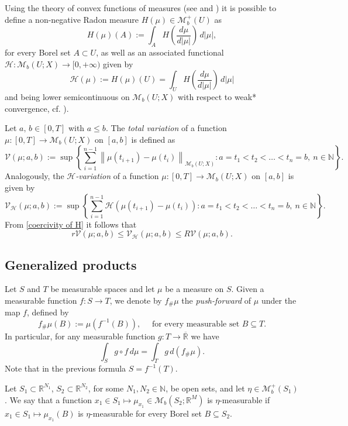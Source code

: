 \documentclass[reqno,10pt]{amsart}
\numberwithin{equation}{section}
\theoremstyle{remark}
\newcommand{\calH}{\mathcal{H}}
\newcommand{\N}{\mathbb{N}}
\newcommand{\R}{\mathbb{R}}
\newcommand{\U}{U}
\newcommand{\calV}{\mathcal{V}}
\newcommand{\closure}[1]{\overline{#1}}
\newcommand{\Mb}{\mathcal{M}_b}
\begin{document}
Using the theory of convex functions of measures (see \cite{Goffman.Serrin.1964} and \cite{Demengel.Temam.1984}) it is possible to define a non-negative Radon measure $H(\mu) \in \Mb^+(U)$ as
\[
	H(\mu)(A) := \int_{A} H\left(\frac{d\mu}{d|\mu|}\right) \,d|\mu|,
\]
for every Borel set $A \subset U$, as well as an associated
 functional $\calH: \Mb(U;X) \to [0,+\infty)$ given by
\[
	\calH(\mu) := H(\mu)(\U) = \int_{\U} H\left(\frac{d\mu}{d|\mu|}\right) \,d|\mu|
\]
and being lower semicontinuous on $\Mb(U;X)$ with respect to weak* convergence, cf. \cite[Theorem 2.38]{ambrosio2000functions}).

Let $a,\, b \in [0,T]$ with $a \leq b$.
The \emph{total variation} of a function $\mu : [0,T] \to \Mb(U;X)$ on $[a,b]$ is defined as
\begin{equation*}
	\calV(\mu; a, b) := \sup\left\{ \sum_{i = 1}^{n-1} \left\|\mu(t_{i+1}) - \mu(t_i)\right\|_{\Mb(U;X)} : a = t_1 < t_2 < \ldots < t_n = b,\ n \in \N \right\}.
\end{equation*}
Analogously, the \emph{$\calH$-variation} of a function $\mu : [0,T] \to \Mb(U;X)$ on $[a,b]$ is given by
\begin{equation*}
	\calV_{\calH}(\mu; a, b) := \sup\left\{ \sum_{i = 1}^{n-1} \calH\left(\mu(t_{i+1}) - \mu(t_i)\right) : a = t_1 < t_2 < \ldots < t_n = b,\ n \in \N \right\}.
\end{equation*}
From \eqref{coercivity of H} it follows that
\begin{equation} \label{equivalence of variations}
	r \calV(\mu; a, b) \leq \calV_{\calH}(\mu; a, b) \leq R \calV(\mu; a, b).
\end{equation}

\subsection{Generalized products}

Let $S$ and $T$ be measurable spaces and let $\mu$ be a measure on $S$.
Given a measurable function $f : S \to T$, we denote by $f_{\#}\mu$ the \emph{push-forward} of $\mu$ under the map $f$, defined by
\[
	f_{\#}\mu(B) := \mu\left(f^{-1}(B)\right), \quad \text{ for every measurable set $B \subseteq T$}.
\]
In particular, for any measurable function $g : T \to \closure{\R}$ we have
\[
	\int_{S} g \circ f \,d\mu = \int_{T} g \,d(f_{\#}\mu).
\]
Note that in the previous formula $S = f^{-1}(T)$.

Let $S_1 \subset \R^{N_1}$, $S_2 \subset \R^{N_2}$, for some $N_1,N_2 \in \N$, be open sets, and let $\eta \in \Mb^+(S_1)$.
We say that a function $x_1 \in S_1 \mapsto \mu_{x_1} \in \Mb(S_2; \R^M )$ is $\eta$-measurable if $x_1 \in S_1 \mapsto \mu_{x_1}(B)$ is $\eta$-measurable for every Borel set $B \subseteq S_2$.
\end{document}
